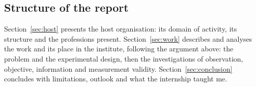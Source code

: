 \subsection{Structure of the report}

Section~\ref{sec:host} presents the host organisation: its domain of activity,
its structure and the professions present. Section~\ref{sec:work} describes and
analyses the work and its place in the institute, following the argument above:
the problem and the experimental design, then the investigations of
observation, objective, information and measurement validity.
Section~\ref{sec:conclusion} concludes with limitations, outlook and what the
internship taught me.

